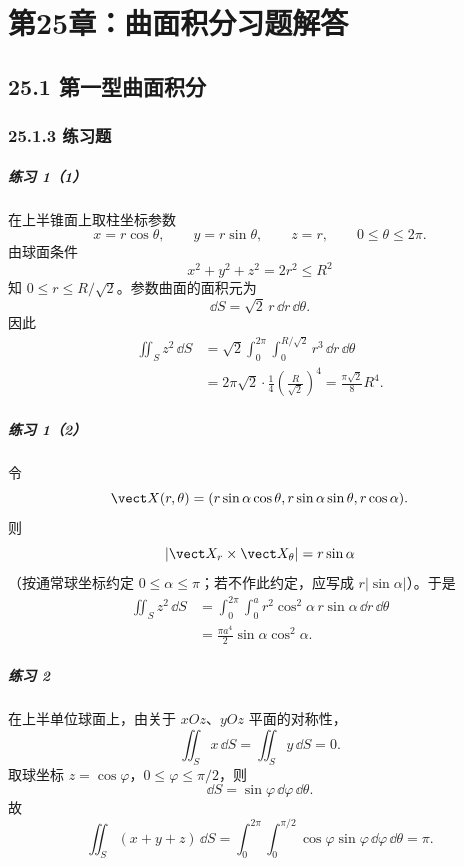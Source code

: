
\chapter*{第25章：曲面积分习题解答}

\section*{25.1 第一型曲面积分}

\subsection*{25.1.3 练习题}

\paragraph{练习 1（1）}
\begin{xsolution}
在上半锥面上取柱坐标参数
\[
  x=r\cos\theta,\qquad y=r\sin\theta,\qquad z=r,
  \qquad 0\le\theta\le2\pi.
\]
由球面条件
\[
  x^2+y^2+z^2=2r^2\le R^2
\]
知 $0\le r\le R/\sqrt2$。参数曲面的面积元为
\[
  \dd S=\sqrt2\,r\,\dd r\,\dd\theta.
\]
因此
\begin{align*}
\iint_S z^2\,\dd S
&=\sqrt2\int_0^{2\pi}\int_0^{R/\sqrt2}r^3\,\dd r\,\dd\theta\\
&=2\pi\sqrt2\cdot\frac14\left(\frac{R}{\sqrt2}\right)^4
=\frac{\pi\sqrt2}{8}R^4.
\end{align*}
\end{xsolution}

\paragraph{练习 1（2）}
\begin{xsolution}
令
\[
  \vect X(r,\theta)
  =(r\sin\alpha\cos\theta,r\sin\alpha\sin\theta,r\cos\alpha).
\]
则
\[
  \left|\vect X_r\times\vect X_\theta\right|=r\sin\alpha
\]
（按通常球坐标约定 $0\le\alpha\le\pi$；若不作此约定，应写成 $r|\sin\alpha|$）。于是
\begin{align*}
\iint_S z^2\,\dd S
&=\int_0^{2\pi}\int_0^a r^2\cos^2\alpha\,r\sin\alpha\,\dd r\,\dd\theta\\
&=\frac{\pi a^4}{2}\sin\alpha\cos^2\alpha.
\end{align*}
\end{xsolution}

\paragraph{练习 2}
\begin{xsolution}
在上半单位球面上，由关于 $xOz$、$yOz$ 平面的对称性，
\[
  \iint_Sx\,\dd S=\iint_Sy\,\dd S=0.
\]
取球坐标 $z=\cos\varphi$，$0\le\varphi\le\pi/2$，则
\[
  \dd S=\sin\varphi\,\dd\varphi\,\dd\theta.
\]
故
\[
  \iint_S(x+y+z)\,\dd S
  =\int_0^{2\pi}\int_0^{\pi/2}\cos\varphi\sin\varphi\,\dd\varphi\,\dd\theta
  =\pi.
\]
\end{xsolution}

